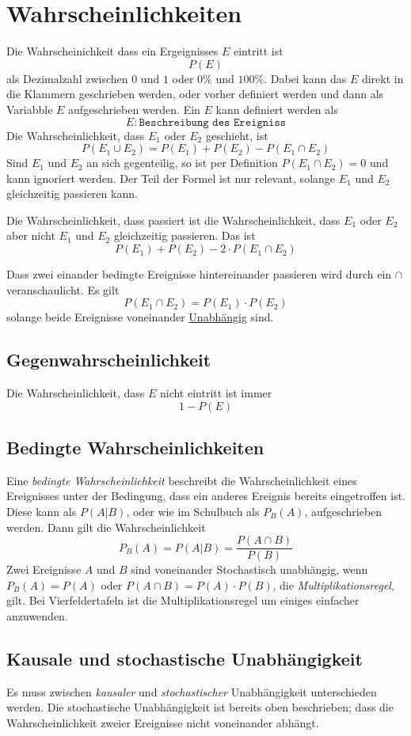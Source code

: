 \documentclass{article}
\begin{document}
 
\section{Wahrscheinlichkeiten} 
Die Wahrscheinichkeit dass ein Ergeignisses $E$ eintritt ist
\[
 P(E) 
\]
als Dezimalzahl zwischen $0$ und $1$ oder $0\%$ und $100\%$. Dabei kann das $E$ direkt in die Klammern geschrieben werden, oder vorher definiert werden und dann als Variabble $E$ aufgeschrieben werden. Ein $E$ kann definiert werden als
\[
 E : \texttt{Beschreibung des Ereigniss} 
\]
Die Wahrscheinlichkeit, dass $E_1$ oder $E_2$ geschieht, ist
\[
 P(E_1 \cup E_2) = P(E_1) + P(E_2) - P(E_1 \cap E_2)
\]
Sind $E_1$ und $E_2$ an sich gegenteilig, so ist per Definition $P(E_1 \cap E_2) = 0$ und kann ignoriert werden. Der Teil der Formel ist nur relevant, solange $E_1$ und $E_2$ gleichzeitig passieren kann.
 
Die Wahrscheinlichkeit, dass  passiert ist die Wahrscheinlichkeit, dass $E_1$ oder $E_2$ aber nicht $E_1$ und $E_2$ gleichzeitig passieren. Das ist
\[
 P(E_1) + P(E_2) - 2 \cdot P(E_1 \cap E_2)
\] 
 
Dass zwei einander bedingte Ereignisse hintereinander passieren wird durch ein $\cap$ veranschaulicht. Es gilt
\[
 P(E_1 \cap E_2) = P(E_1) \cdot P(E_2)
\]
solange beide Ereignisse voneinander \hyperref[Unabhängigkeiten]{Unabhängig} sind. 
\subsection{Gegenwahrscheinlichkeit}
Die Wahrscheinlichkeit, dass $E$ nicht eintritt ist immer
\[
 1 - P(E) 
\] 
 
\subsection{Bedingte Wahrscheinlichkeiten}
Eine \emph{bedingte Wahrscheinlichkeit} beschreibt die Wahrscheinlichkeit eines Ereignisses unter der Bedingung, dass ein anderes Ereignis bereits eingetroffen ist. Diese kann als $P(A|B)$, oder wie im Schulbuch als $P_B(A)$, aufgeschrieben werden. Dann gilt die Wahrscheinlichkeit 
\[ 
 P_B(A) = P(A|B) = \frac{P(A \cap B)}{P(B)}
\] 
Zwei Ereignisse $A$ und $B$ sind voneinander Stochastisch unabhängig, wenn $P_B(A)=P(A)$ oder $P(A \cap B) = P(A) \cdot P(B)$, die \emph{Multiplikationsregel}, gilt. Bei Vierfeldertafeln ist die Multiplikationsregel um einiges einfacher anzuwenden. 
 
\subsection{Kausale und stochastische Unabhängigkeit}
Es muss zwischen \emph{kausaler} und \emph{stochastischer} Unabhängigkeit unterschieden werden. Die stochastische Unabhängigkeit ist bereits oben beschrieben; dass die Wahrscheinlichkeit zweier Ereignisse nicht voneinander abhängt.
 
\end{document}
